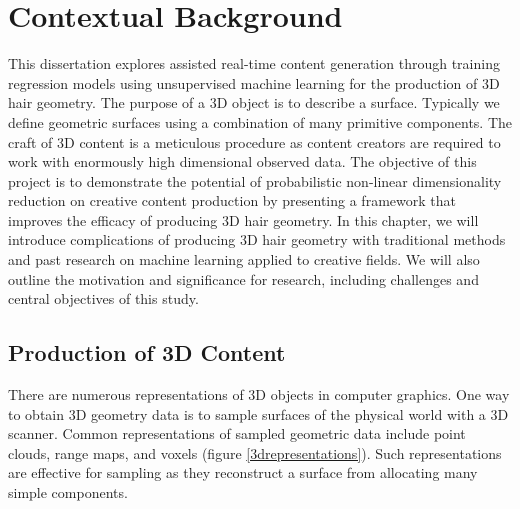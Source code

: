 \documentclass[ %
author={Dillon Keith Diep},
supervisor={Dr. Carl Henrik Ek},
degree={MEng},
title={ART-CG Hair:},
subtitle={Assisted Real-time Content Generation of Stylised Virtual Hair},
type={Research},
year={2017} ]{dissertation}
\begin{document}
%

\mainmatter


\chapter{Contextual Background}
\label{chap:context}
This dissertation explores assisted real-time content generation through training regression models using unsupervised machine learning for the production of 3D hair geometry.
The purpose of a 3D object is to describe a surface. Typically we define geometric surfaces using a combination of many primitive components. The craft of 3D content is a meticulous procedure as content creators are required to work with enormously high dimensional observed data.
The objective of this project is to demonstrate the potential of probabilistic non-linear dimensionality reduction on creative content production by presenting a framework that improves the efficacy of producing 3D hair geometry. 
In this chapter, we will introduce complications of producing 3D hair geometry with traditional methods and past research on machine learning applied to creative fields. We will also outline the motivation and significance for research, including challenges and central objectives of this study.

\section{Production of 3D Content}
There are numerous representations of 3D objects in computer graphics. One way to obtain 3D geometry data is to sample surfaces of the physical world with a 3D scanner. Common representations of sampled geometric data include point clouds, range maps, and voxels (figure \ref{3drepresentations}). Such representations are effective for sampling as they reconstruct a surface from allocating many simple components.
\end{document}

